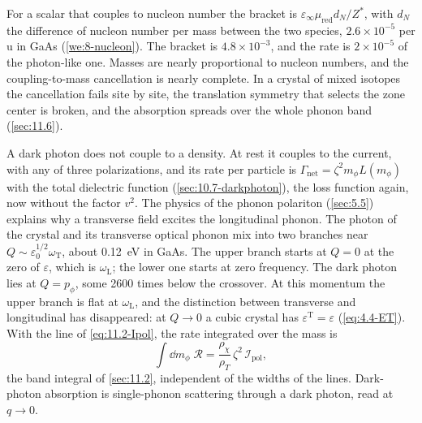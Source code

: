 For a scalar that couples to nucleon number the bracket is $\varepsilon_\infty\mu_{\mathrm{red}}d_N/Z^*$, with $d_N$ the difference of nucleon number per mass between the two species, $2.6\times10^{-5}$ per u in GaAs (\cref{we:8-nucleon}). The bracket is $4.8\times10^{-3}$, and the rate is $2\times10^{-5}$ of the photon-like one. Masses are nearly proportional to nucleon numbers, and the coupling-to-mass cancellation is nearly complete. In a crystal of mixed isotopes the cancellation fails site by site, the translation symmetry that selects the zone center is broken, and the absorption spreads over the whole phonon band (\cref{sec:11.6}).

A dark photon does not couple to a density. At rest it couples to the current, with any of three polarizations, and its rate per particle is $\varGamma_{\mathrm{net}} = \zeta^2m_\phi L(m_\phi)$ with the total dielectric function (\cref{sec:10.7-darkphoton}), the loss function again, now without the factor $v^2$. The physics of the phonon polariton (\cref{sec:5.5}) explains why a transverse field excites the longitudinal phonon. The photon of the crystal and its transverse optical phonon mix into two branches near $Q \sim \varepsilon_0^{1/2}\omega_{\mathrm{T}}$, about \SI{0.12}{eV} in GaAs. The upper branch starts at $Q = 0$ at the zero of $\varepsilon$, which is $\omega_{\mathrm{L}}$; the lower one starts at zero frequency. The dark photon lies at $Q = p_\phi$, some 2600 times below the crossover. At this momentum the upper branch is flat at $\omega_{\mathrm{L}}$, and the distinction between transverse and longitudinal has disappeared: at $Q \to 0$ a cubic crystal has $\varepsilon^{\mathrm{T}} = \varepsilon$ (\cref{eq:4.4-ET}). With the line of \cref{eq:11.2-Ipol}, the rate integrated over the mass is
\begin{equation}
  \int\dd m_\phi\;\mathcal{R} = \frac{\rho_\chi}{\rho_T}\,\zeta^2\,\mathcal{I}_{\mathrm{pol}} ,
  \label{eq:11.8-Rint}
\end{equation}
the band integral of \cref{sec:11.2}, independent of the widths of the lines. Dark-photon absorption is single-phonon scattering through a dark photon, read at $q \to 0$.

